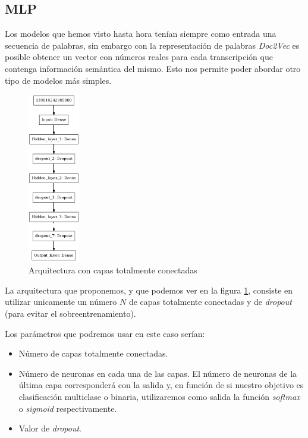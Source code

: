 \subsection{MLP}
Los modelos que hemos visto hasta hora tenían siempre como entrada una secuencia de palabras, sin embargo con la representación de palabras \textit{Doc2Vec} es posible obtener un vector con números reales para cada transcripción que contenga información semántica del mismo. Esto nos permite poder abordar otro tipo de modelos más simples.  

\begin{figure}[!ht]
	\centering
	\includegraphics[width=0.20\textwidth]{images/super/arq_dense}
	\caption{Arquitectura con capas totalmente conectadas}
	\label{fig:arqdense}
\end{figure}

La arquitectura que proponemos, y que podemos ver en la figura \ref{fig:arqdense}, consiste en utilizar unicamente un número $N$ de capas totalmente conectadas y de \textit{dropout} (para evitar el sobreentrenamiento).

Los parámetros que podremos usar en este caso serían: 


\begin{itemize}

\item Número de capas totalmente conectadas. 
\item Número de neuronas en cada una de las capas. El número de neuronas de la última capa corresponderá con la salida y, en función de si nuestro objetivo es clasificación multiclase o binaria, utilizaremos como salida la función \textit{softmax} o \textit{sigmoid} respectivamente.
\item Valor de \textit{dropout}.
\end{itemize}


